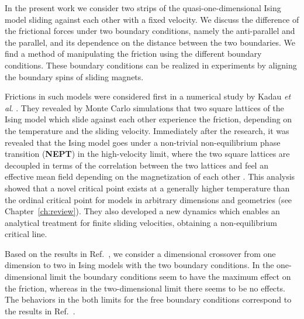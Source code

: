 In the present work we consider two strips of the quasi-one-dimensional Ising model sliding against each other with a fixed velocity. We discuss the difference of the frictional forces under two boundary conditions, namely the anti-parallel and the parallel, and its dependence on the distance  between the two boundaries. We find a method of manipulating the friction using the  different boundary conditions. These boundary conditions can be realized in experiments  by aligning the boundary spins of sliding magnets.

Frictions in such models were considered first in a numerical study by Kadau \textit{et al}. \cite{Kadau2008}. They revealed by Monte Carlo simulations that two square lattices of the Ising model which slide against each other experience the friction, depending on the temperature and the sliding velocity. Immediately after the research, it was revealed \cite{Hucht2009b} that the Ising model goes under a non-trivial non-equilibrium phase transition (\textbf{NEPT}) in the high-velocity limit, where the two square lattices are decoupled in terms of the correlation between the two lattices and feel an effective mean field depending on the magnetization of each other \cite{Hucht2009b}. This analysis showed that a novel critical point exists at a generally higher temperature than the ordinal critical point for models in arbitrary dimensions and geometries (see Chapter~\ref{ch:review}). They also developed a new dynamics \cite{Hucht2009b} which enables an analytical treatment for finite sliding velocities, obtaining a non-equilibrium critical line.

Based on the results in Ref.~\cite{Hucht2009b}, we consider a dimensional crossover from one dimension to two in Ising models with the two boundary conditions. In the one-dimensional limit the boundary conditions seem to have the maximum effect on the friction, whereas in the two-dimensional limit there seems to be no effects. The behaviors in the both limits for the free boundary conditions correspond to the results in Ref.~\cite{Hucht2009b}. 